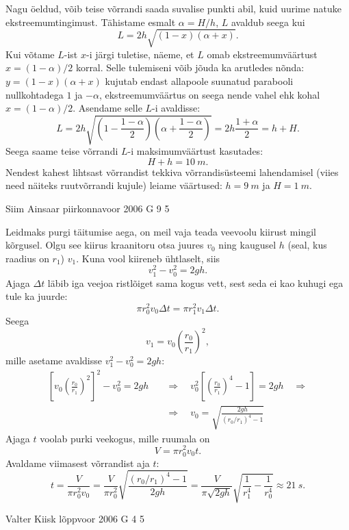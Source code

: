 \documentclass[11pt]{article}
\begin{document}
{{Nagu öeldud, võib teise võrrandi saada suvalise punkti abil, kuid uurime natuke ekstreemumtingimust. Tähistame esmalt $\alpha = H/h$, $L$ avaldub seega kui
\[
L=2 h \sqrt{(1-x)(\alpha+x)}.
\]
Kui võtame $L$-ist $x$-i järgi tuletise, näeme, et $L$ omab ekstreemumväärtust $x = (1 - \alpha )/2$ korral. Selle tulemiseni võib jõuda ka arutledes nõnda: $y = (1-x)(\alpha +x)$ kujutab endast allapoole suunatud parabooli nullkohtadega $1$ ja $-\alpha$, ekstreemumväärtus on seega nende vahel ehk kohal $x = (1 - \alpha )/2$. Asendame selle $L$-i avaldisse:
\[
L=2 h \sqrt{\left(1-\frac{1-\alpha}{2}\right)\left(\alpha+\frac{1-\alpha}{2}\right)}=2 h \frac{1+\alpha}{2}=h+H.
\]
Seega saame teise võrrandi $L$-i maksimumväärtust kasutades:
\[
H + h = \SI{10}{m}.
\]
Nendest kahest lihtsast võrrandist tekkiva võrrandisüsteemi lahendamisel (viies need näiteks ruutvõrrandi kujule) leiame väärtused: $h = \SI{9}{m}$ ja $H = \SI{1}{m}$.
\fi
}

{Siim Ainsaar} %
{piirkonnavoor} %
{2006} %
{G 9} %
{5} %
{

\ifSolution
Leidmaks purgi täitumise aega, on meil vaja teada veevoolu kiirust mingil kõrgusel. Olgu see kiirus kraanitoru otsa juures $v_0$ ning kaugusel $h$ (seal, kus raadius on $r_1$) $v_1$. Kuna vool kiireneb ühtlaselt, siis
\[
v_1^2 - v_0^2 = 2gh.
\]
Ajaga $\Delta t$ läbib iga veejoa ristlõiget sama kogus vett, sest seda ei kao kuhugi ega tule ka juurde:
\[
\pi r_0^2 v_0\Delta t = \pi r_1^2 v_1\Delta t.
\]
Seega
\[
v_1 = v_0 \left(\frac{r_0}{r_1}\right)^2,
\]
mille asetame avaldisse $v_1^2-v_0^2=2gh$:
\[
\begin{aligned}
\left[v_{0}\left(\frac{r_{0}}{r_{1}}\right)^{2}\right]^{2}-v_{0}^{2}=2 g h \quad&\Rightarrow\quad v_{0}^{2}\left[\left(\frac{r_{0}}{r_{1}}\right)^{4}-1\right]=2 g h \quad\Rightarrow\\
&\Rightarrow \quad v_{0}=\sqrt{\frac{2 g h}{\left(r_{0} / r_{1}\right)^{4}-1}}
\end{aligned}
\]
Ajaga $t$ voolab purki veekogus, mille ruumala on
\[
V = \pi r_0^2 v_0t.
\]
Avaldame viimasest võrrandist aja $t$:
\[
t=\frac{V}{\pi r_{0}^{2} v_{0}}=\frac{V}{\pi r_{0}^{2}} \sqrt{\frac{\left(r_{0} / r_{1}\right)^{4}-1}{2 g h}} = \frac{V}{\pi \sqrt{2 g h}} \sqrt{\frac{1}{r_{1}^{4}}-\frac{1}{r_{0}^{4}}}\approx \SI{21}{s}.
\]
\fi
}

{Valter Kiisk} %
{lõppvoor} %
{2006} %
{G 4} %
{5} %
{

}}
\end{document}
